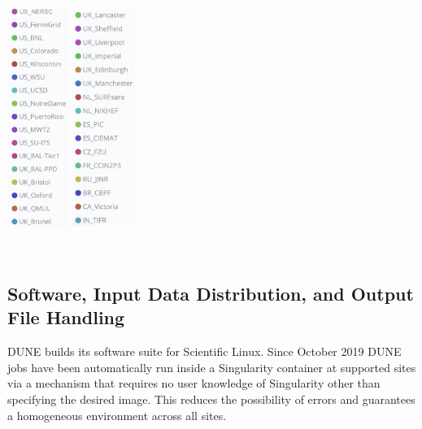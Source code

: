 \documentclass[../main-v1.tex]{subfiles}
\begin{document}
\begin{dunefigure}
{\includegraphics[height=3.5in,width=0.15\textwidth]{graphics/Workflow/walltimesite1.png}
\includegraphics[height=3.5in,width=0.15\textwidth]{graphics/Workflow/walltimesite2.png}}
\end{dunefigure}


\subsection{%
Software, Input Data Distribution, and Output File Handling}
\label{subsec:io}
DUNE builds its software suite for  Scientific Linux. Since October 2019 DUNE jobs %
have been automatically run inside a Singularity container at supported sites via a  mechanism that requires no user knowledge of Singularity other than specifying the desired image. This %
reduces the possibility of errors and guarantees a homogeneous environment across all sites.
\end{document}
